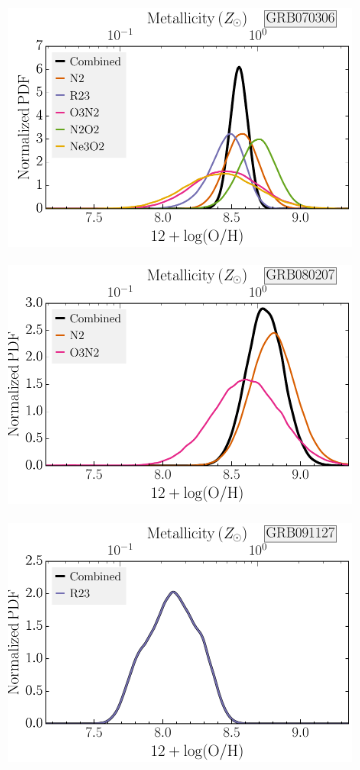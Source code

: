 \documentclass[traditabstract, longauth]{aa}
\begin{document}
\begin{appendix}
\begin{figure}
\begin{subfigure}{.33\textwidth}
  \includegraphics[width=0.999\linewidth]{Figs/GRB070306_met_combined.pdf}
\end{subfigure}
\begin{subfigure}{.33\textwidth}
  \includegraphics[width=0.999\linewidth]{Figs/GRB080207_met_combined.pdf}
\end{subfigure}
\begin{subfigure}{.33\textwidth}
  \includegraphics[width=0.999\linewidth]{Figs/GRB091127_met_combined.pdf}

\end{subfigure}
\end{figure}
\end{appendix}
\end{document}
